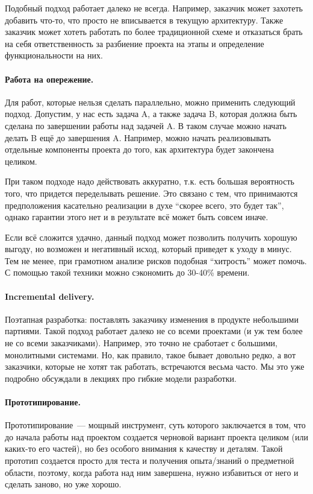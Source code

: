 \documentclass{../../text-style}
\begin{document}
Подобный подход работает далеко не всегда. Например, заказчик может захотеть добавить что-то, что просто не вписывается в текущую архитектуру. Также заказчик может хотеть работать по более традиционной схеме и отказаться брать на себя ответственность за разбиение проекта на этапы и определение функциональности на них.

\paragraph{Работа на опережение.} Для работ, которые нельзя сделать параллельно, можно применить следующий подход. Допустим, у нас есть задача A, а также задача B, которая должна быть сделана по завершении работы над задачей A. В таком случае можно начать делать B ещё до завершения A. Например, можно начать реализовывать отдельные компоненты проекта до того, как архитектура будет закончена целиком.

При таком подходе надо действовать аккуратно, т.к. есть большая вероятность того, что придется переделывать решение. Это связано с тем, что принимаются предположения касательно реализации в духе \enquote{скорее всего, это будет так}, однако гарантии этого нет и в результате всё может быть совсем иначе.

Если всё сложится удачно, данный подход может позволить получить хорошую выгоду, но возможен и негативный исход, который приведет к уходу в минус. Тем не менее, при грамотном анализе рисков подобная \enquote{хитрость} может помочь. С помощью такой техники можно сэкономить до 30-40\% времени.

\paragraph{Incremental delivery.} Поэтапная разработка: поставлять заказчику изменения в продукте небольшими партиями. Такой подход работает далеко не со всеми проектами (и уж тем более не со всеми заказчиками). Например, это точно не сработает с большими, монолитными системами. Но, как правило, такое бывает довольно редко, а вот заказчики, которые не хотят так работать, встречаются весьма часто. Мы это уже подробно обсуждали в лекциях про гибкие модели разработки.

\paragraph{Прототипирование.} Прототипирование~--- мощный инструмент, суть которого заключается в том, что до начала работы над проектом создается черновой вариант проекта целиком (или каких-то его частей), но без особого внимания к качеству и деталям. Такой прототип создается просто для теста и получения опыта/знаний о предметной области, поэтому, когда работа над ним завершена, нужно избавиться от него и сделать заново, но уже хорошо.
\end{document}
